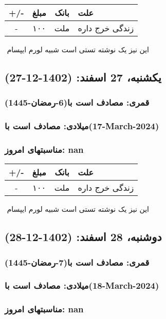 \documentclass{article}
\newcommand{\rnote}[1]{\marginpar{\textcolor{color}{\StrSubstitute{\##1}{ }{\_}}}}
\newcommand{\myRow}[4]{
    #1 & #2 & #3 & #4 \\ \hline
}
\begin{document}
\begin{tabular}{ | c | c | c | p{5cm} |}
    \hline
    \myRow{ +/- }{مبلغ}{بانک}{علت}
    \myRow{-}{۱۰۰}{ملت}{زندگی خرج داره}
\end{tabular}
\newline
\newline

‌
\rnote{تست}
این نیز یک نوشته تستی است شبیه لورم ایپسام




\newpage
{}
\textcolor{color}{
\section{ یکشنبه، 27 اسفند: (1402-12-27) }
\subsubsection*{قمری: مصادف است با(6-رمضان-1445)} 
\subsubsection*{میلادی: مصادف است با(17-March-2024)}
\subsubsection*{مناسبتهای امروز: nan}
}


\begin{tabular}{ | c | c | c | p{5cm} |}
    \hline
    \myRow{ +/- }{مبلغ}{بانک}{علت}
    \myRow{-}{۱۰۰}{ملت}{زندگی خرج داره}
\end{tabular}
\newline
\newline

‌
\rnote{تست}
این نیز یک نوشته تستی است شبیه لورم ایپسام




\newpage
{}
\textcolor{color}{
\section{ دوشنبه، 28 اسفند: (1402-12-28) }
\subsubsection*{قمری: مصادف است با(7-رمضان-1445)} 
\subsubsection*{میلادی: مصادف است با(18-March-2024)}
\subsubsection*{مناسبتهای امروز: nan}
}
\end{document}
